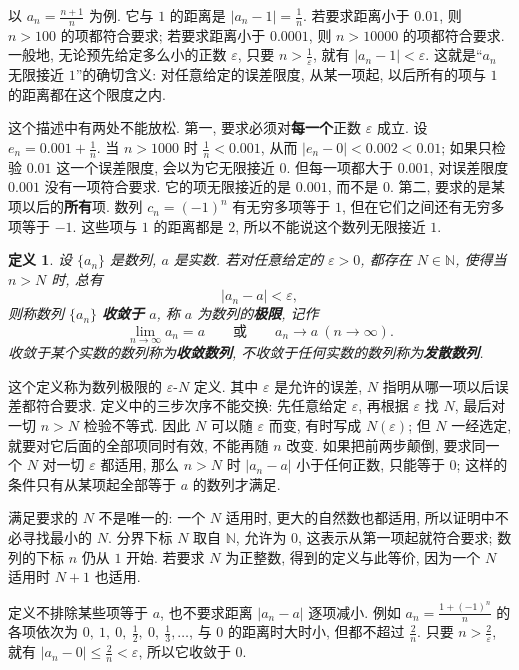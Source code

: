 \documentclass[UTF8,openany]{ctexbook}
\theoremstyle{chinesetextbook}
\newtheorem{definition}{定义}[section]
\begin{document}
以 $\displaystyle a_n=\frac{n+1}n$ 为例. 它与 $1$ 的距离是 $\displaystyle|a_n-1|=\frac1n$. 若要求距离小于 $0.01$, 则 $n>100$ 的项都符合要求; 若要求距离小于 $0.0001$, 则 $n>10000$ 的项都符合要求. 一般地, 无论预先给定多么小的正数 $\varepsilon$, 只要 $\displaystyle n>\frac1\varepsilon$, 就有 $|a_n-1|<\varepsilon$. 这就是“$a_n$ 无限接近 $1$”的确切含义: 对任意给定的误差限度, 从某一项起, 以后所有的项与 $1$ 的距离都在这个限度之内.

这个描述中有两处不能放松. 第一, 要求必须对\textbf{每一个}正数 $\varepsilon$ 成立. 设 $\displaystyle e_n=0.001+\frac1n$. 当 $n>1000$ 时 $\displaystyle\frac1n<0.001$, 从而 $|e_n-0|<0.002<0.01$; 如果只检验 $0.01$ 这一个误差限度, 会以为它无限接近 $0$. 但每一项都大于 $0.001$, 对误差限度 $0.001$ 没有一项符合要求. 它的项无限接近的是 $0.001$, 而不是 $0$. 第二, 要求的是某项以后的\textbf{所有}项. 数列 $c_n=(-1)^n$ 有无穷多项等于 $1$, 但在它们之间还有无穷多项等于 $-1$. 这些项与 $1$ 的距离都是 $2$, 所以不能说这个数列无限接近 $1$.
\begin{definition}
设 $\{a_n\}$ 是数列, $a$ 是实数. 若对任意给定的 $\varepsilon>0$, 都存在 $N\in\mathbb N$, 使得当 $n>N$ 时, 总有
\[
|a_n-a|<\varepsilon,
\]
则称数列 $\{a_n\}$ \textbf{收敛于} $a$, 称 $a$ 为数列的\textbf{极限}, 记作
\[
\lim_{n\to\infty}a_n=a\qquad\text{或}\qquad a_n\to a\ (n\to\infty).
\]
收敛于某个实数的数列称为\textbf{收敛数列}, 不收敛于任何实数的数列称为\textbf{发散数列}.
\end{definition}
这个定义称为数列极限的 $\varepsilon$-$N$ 定义. 其中 $\varepsilon$ 是允许的误差, $N$ 指明从哪一项以后误差都符合要求. 定义中的三步次序不能交换: 先任意给定 $\varepsilon$, 再根据 $\varepsilon$ 找 $N$, 最后对一切 $n>N$ 检验不等式. 因此 $N$ 可以随 $\varepsilon$ 而变, 有时写成 $N(\varepsilon)$; 但 $N$ 一经选定, 就要对它后面的全部项同时有效, 不能再随 $n$ 改变. 如果把前两步颠倒, 要求同一个 $N$ 对一切 $\varepsilon$ 都适用, 那么 $n>N$ 时 $|a_n-a|$ 小于任何正数, 只能等于 $0$; 这样的条件只有从某项起全部等于 $a$ 的数列才满足.

满足要求的 $N$ 不是唯一的: 一个 $N$ 适用时, 更大的自然数也都适用, 所以证明中不必寻找最小的 $N$. 分界下标 $N$ 取自 $\mathbb N$, 允许为 $0$, 这表示从第一项起就符合要求; 数列的下标 $n$ 仍从 $1$ 开始. 若要求 $N$ 为正整数, 得到的定义与此等价, 因为一个 $N$ 适用时 $N+1$ 也适用.

定义不排除某些项等于 $a$, 也不要求距离 $|a_n-a|$ 逐项减小. 例如 $\displaystyle a_n=\frac{1+(-1)^n}n$ 的各项依次为 $\displaystyle0,\ 1,\ 0,\ \frac12,\ 0,\ \frac13,\ldots$, 与 $0$ 的距离时大时小, 但都不超过 $\displaystyle\frac2n$. 只要 $\displaystyle n>\frac2\varepsilon$, 就有 $\displaystyle|a_n-0|\le\frac2n<\varepsilon$, 所以它收敛于 $0$.
\end{document}
